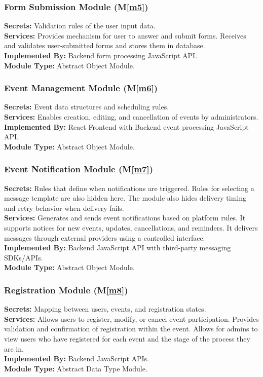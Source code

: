 \documentclass[12pt, titlepage]{article}
\newcommand{\mref}[1]{M\ref{#1}}
\begin{document}
\subsubsection{Form Submission Module (\mref{m5})}
\textbf{Secrets:} Validation rules of the user input data.\\
\textbf{Services:} Provides mechanism for user to answer and submit forms. Receives and validates user-submitted forms and stores them in database.\\
\textbf{Implemented By:} Backend form processing JavaScript API.\\
\textbf{Module Type:} Abstract Object Module.

\subsubsection{Event Management Module (\mref{m6})}
\textbf{Secrets:} Event data structures and scheduling rules.\\
\textbf{Services:} Enables creation, editing, and cancellation of events by administrators.\\
\textbf{Implemented By:} React Frontend with Backend event processing JavaScript API.\\
\textbf{Module Type:} Abstract Object Module.

\subsubsection{Event Notification Module (\mref{m7})}
\textbf{Secrets:} Rules that define when notifications are triggered. Rules for selecting a message template are also hidden here. The module also hides delivery timing and retry behavior when delivery fails.\\
\textbf{Services:} Generates and sends event notifications based on platform rules. It supports notices for new events, updates, cancellations, and reminders. It delivers messages through external providers using a controlled interface.\\
\textbf{Implemented By:} Backend JavaScript API with third-party messaging SDKs/APIs.\\
\textbf{Module Type:} Abstract Object Module.

\subsubsection{Registration Module (\mref{m8})}
\textbf{Secrets:} Mapping between users, events, and registration states.\\
\textbf{Services:} Allows users to register, modify, or cancel event participation. Provides validation and confirmation of registration within the event. Allows for admins to view users who have registered for each event and the stage of the process they are in.\\
\textbf{Implemented By:} Backend JavaScript APIs.\\
\textbf{Module Type:} Abstract Data Type Module.
\end{document}

